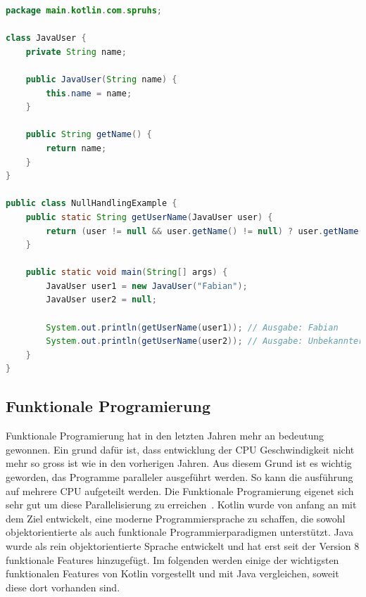 \documentclass[11pt]{article}
\begin{document}
    \begin{lstlisting}[language=Java, caption={NullHandlingExample.java}, label={lst:java-user-null-safety}]
    package main.kotlin.com.spruhs;

class JavaUser {
    private String name;

    public JavaUser(String name) {
        this.name = name;
    }

    public String getName() {
        return name;
    }
}

public class NullHandlingExample {
    public static String getUserName(JavaUser user) {
        return (user != null && user.getName() != null) ? user.getName() : "Unbekannter Benutzer";
    }

    public static void main(String[] args) {
        JavaUser user1 = new JavaUser("Fabian");
        JavaUser user2 = null;

        System.out.println(getUserName(user1)); // Ausgabe: Fabian
        System.out.println(getUserName(user2)); // Ausgabe: Unbekannter Benutzer
    }
}
    \end{lstlisting}

    \subsection{Funktionale Programierung}

    Funktionale Programierung hat in den letzten Jahren mehr an bedeutung gewonnen.
    Ein grund dafür ist, dass entwicklung der CPU Geschwindigkeit nicht mehr so gross ist wie in den vorherigen Jahren.
    Aus diesem Grund ist es wichtig geworden, das Programme paralleler ausgeführt werden.
    So kann die ausführung auf mehrere CPU aufgeteilt werden.
    Die Funktionale Programierung eigenet sich sehr gut um diese Parallelisierung zu erreichen~\cite[129]{kotlin-patterns}.
    Kotlin wurde von anfang an mit dem Ziel entwickelt, eine moderne Programmiersprache zu schaffen, die sowohl objektorientierte als auch funktionale Programmierparadigmen unterstützt.
    Java wurde als rein objektorientierte Sprache entwickelt und hat erst seit der Version 8 funktionale Features hinzugefügt.
    Im folgenden werden einige der wichtigsten funktionalen Features von Kotlin vorgestellt und mit Java vergleichen, soweit diese dort vorhanden sind.\\
\end{document}
